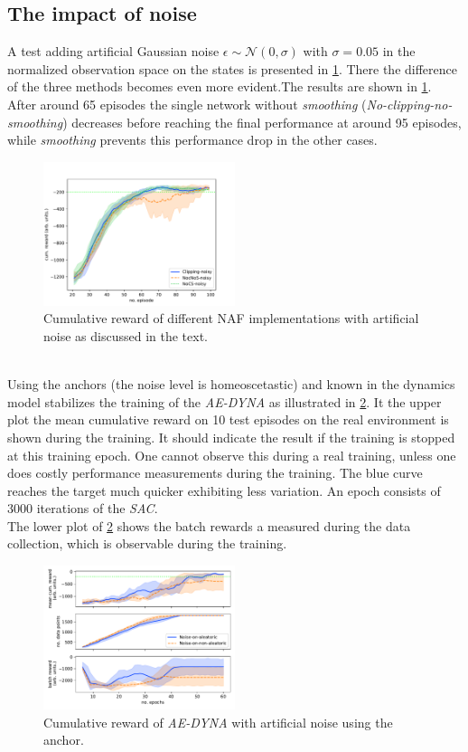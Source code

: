 \documentclass[
reprint,
amsmath,amssymb,amsfonts,clevref,
aps,
prstab,
]{revtex4-2}
\begin{document}
	\subsection{The impact of noise}
	A test adding artificial Gaussian noise $\epsilon \sim \mathcal{N}(0, \sigma)$ with $\sigma=0.05$ in the normalized observation space on the states is presented in \cref{fig:comparsion_noise}. There the difference of the three methods becomes even more evident.The results are shown in \cref{fig:comparsion_noise}. After around 65 episodes the single network without \emph{smoothing} (\emph{No-clipping-no-smoothing}) decreases before reaching the final performance at around 95 episodes, while  \emph{smoothing} prevents this performance drop in the other cases. 
	\begin{figure}[!h]
		\centering
		\includegraphics*[width=0.5\textwidth]{Figures/Comparison_noise}
		\caption{Cumulative reward of different NAF implementations with artificial noise as discussed in the text.}
		\label{fig:comparsion_noise}
	\end{figure}
	\\Using the anchors (the noise level is homeoscetastic) and known in the dynamics model stabilizes the training of the \emph{AE-DYNA} as illustrated in \cref{fig:comparsion_noise_ae_dyna}. It the upper plot the mean cumulative reward on 10 test episodes on the real environment is shown during the training. It should indicate the result if the training is stopped at this training epoch. One cannot observe this during a real training, unless one does costly performance measurements during the training. The blue curve reaches the target much quicker exhibiting less variation. An epoch consists of 3000 iterations of the \emph{SAC}.\\
	The lower plot of \cref{fig:comparsion_noise_ae_dyna} shows the batch rewards a measured during the data collection, which is observable during the training.
	\begin{figure}[!h]
		\centering
		\includegraphics*[width=0.5\textwidth]{Figures/Comparison_noise_ae_dyna}
		\caption{Cumulative reward of \emph{AE-DYNA} with artificial noise using the anchor.}
		\label{fig:comparsion_noise_ae_dyna}
	\end{figure}
\end{document}
